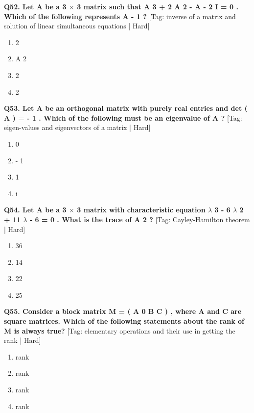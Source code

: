 \noindent\textbf{Q52. Let A be a 3 $\times$ 3 matrix such that A 3 + 2 A 2 - A - 2 I = 0 . Which of the following represents A - 1 ?} \hfill [Tag: inverse of a matrix and solution of linear simultaneous equations | Hard]
\begin{enumerate}[label=(\alph*),topsep=2pt,itemsep=1pt,partopsep=0pt,parsep=0pt]
    \item {{2}}
    \item {{A 2}}
    \item {{2}}
    \item {{2}}
\end{enumerate}
\vspace{2mm}

\noindent\textbf{Q53. Let A be an orthogonal matrix with purely real entries and det ( A ) = - 1 . Which of the following must be an eigenvalue of A ?} \hfill [Tag: eigen-values and eigenvectors of a matrix | Hard]
\begin{enumerate}[label=(\alph*),topsep=2pt,itemsep=1pt,partopsep=0pt,parsep=0pt]
    \item {{0}}
    \item {{- 1}}
    \item {{1}}
    \item {{i}}
\end{enumerate}
\vspace{2mm}

\noindent\textbf{Q54. Let A be a 3 $\times$ 3 matrix with characteristic equation $\lambda$ 3 - 6 $\lambda$ 2 + 11 $\lambda$ - 6 = 0 . What is the trace of A 2 ?} \hfill [Tag: Cayley-Hamilton theorem | Hard]
\begin{enumerate}[label=(\alph*),topsep=2pt,itemsep=1pt,partopsep=0pt,parsep=0pt]
    \item {{36}}
    \item {{14}}
    \item {{22}}
    \item {{25}}
\end{enumerate}
\vspace{2mm}

\noindent\textbf{Q55. Consider a block matrix M = ( A 0 B C ) , where A and C are square matrices. Which of the following statements about the rank of M is always true?} \hfill [Tag: elementary operations and their use in getting the rank | Hard]
\begin{enumerate}[label=(\alph*),topsep=2pt,itemsep=1pt,partopsep=0pt,parsep=0pt]
    \item {{rank}}
    \item {{rank}}
    \item {{rank}}
    \item {{rank}}
\end{enumerate}
\vspace{2mm}

